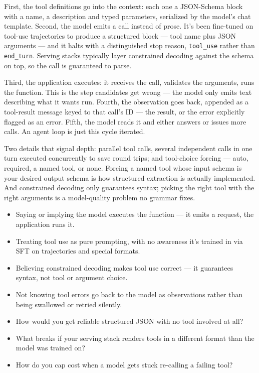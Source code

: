 \documentclass[10pt,twoside]{book}
\newcommand{\lab}[1]{\par\vspace{5pt}\noindent{\sffamily\footnotesize\bfseries\color{accent}#1}\par\vspace{1pt}}
\newcommand{\flab}[1]{\par\vspace{5pt}\noindent{\sffamily\footnotesize\bfseries\color{flag}#1}\par\vspace{1pt}}
\begin{document}
First, the tool definitions go into the context: each one a JSON-Schema block with a name, a description and typed parameters, serialized by the model's chat template. Second, the model emits a call instead of prose. It's been fine-tuned on tool-use trajectories to produce a structured block --- tool name plus JSON arguments --- and it halts with a distinguished stop reason, \texttt{tool\_use} rather than \texttt{end\_turn}. Serving stacks typically layer constrained decoding against the schema on top, so the call is guaranteed to parse.\par\vspace{3pt}
Third, the application executes: it receives the call, validates the arguments, runs the function. This is the step candidates get wrong --- the model only emits text describing what it wants run. Fourth, the observation goes back, appended as a tool-result message keyed to that call's ID --- the result, or the error explicitly flagged as an error. Fifth, the model reads it and either answers or issues more calls. An agent loop is just this cycle iterated.\par\vspace{3pt}
Two details that signal depth: parallel tool calls, several independent calls in one turn executed concurrently to save round trips; and tool-choice forcing --- auto, required, a named tool, or none. Forcing a named tool whose input schema is your desired output schema is how structured extraction is actually implemented. And constrained decoding only guarantees syntax; picking the right tool with the right arguments is a model-quality problem no grammar fixes.\par\vspace{3pt}
\flab{Loses the signal}
\begin{itemize}
\item Saying or implying the model executes the function --- it emits a request, the application runs it.
\item Treating tool use as pure prompting, with no awareness it's trained in via SFT on trajectories and special formats.
\item Believing constrained decoding makes tool use correct --- it guarantees syntax, not tool or argument choice.
\item Not knowing tool errors go back to the model as observations rather than being swallowed or retried silently.
\end{itemize}
\lab{Then they ask}
\begin{itemize}
\item How would you get reliable structured JSON with no tool involved at all?
\item What breaks if your serving stack renders tools in a different format than the model was trained on?
\item How do you cap cost when a model gets stuck re-calling a failing tool?
\end{itemize}
\vspace{2pt}\noindent{\color{muted}\rule{\linewidth}{0.3pt}}
\end{document}
